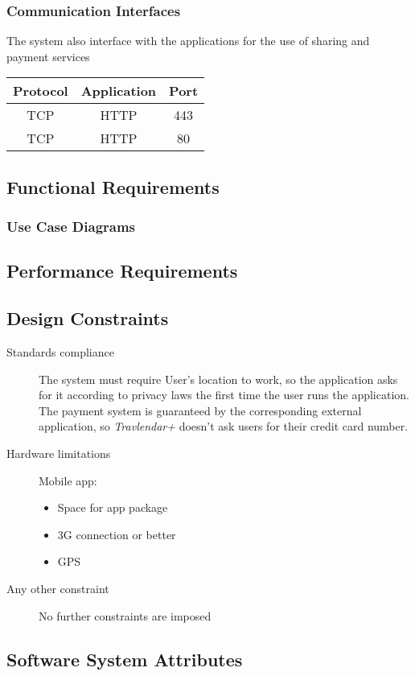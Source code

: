 	\subsubsection{Communication Interfaces}
		The system also interface with the applications for the use of sharing and payment services
		\hfill
		\begin{tabular}{| c | c | c |}
			\hline
			Protocol	& Application	& Port \\
			\hline
			\hline
			TCP		& HTTP		& 443 \\
			\hline
			TCP		& HTTP		& 80 \\
			\hline
		\end{tabular}
	
\subsection{Functional Requirements}
	
	\subsubsection{Use Case Diagrams}
		
			
\subsection{Performance Requirements}
		
		
\subsection{Design Constraints}
		\begin{description}
			\item[Standards compliance]
			The system must require User’s location to work, so the application asks for it according to privacy laws the first time the user runs the application.
			The payment system is guaranteed by the corresponding external application, so \textit{Travlendar+} doesn’t ask users for their credit card number.

			\item[Hardware limitations]
			Mobile app:
			\begin{itemize}
			\item Space for app package
			\item 3G connection or better
			\item GPS
		\end{itemize}

			\item[Any other constraint]
			No further constraints are imposed
\end{description}
		
\subsection{Software System Attributes}
	
